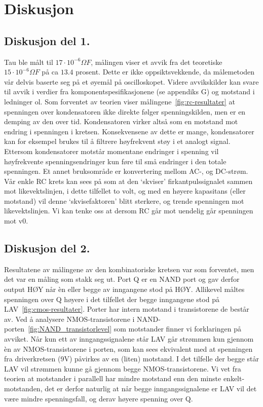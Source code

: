 \section{Diskusjon}

\subsection{Diskusjon del 1.}

    Tau ble målt til $17 \cdot 10^{-6} \Omega F$, målingen viser et avvik fra det teoretiske $15 \cdot 10^{-6} \Omega F$ på ca $13.4$ prosent.
    Dette er ikke oppsiktsvekkende, da målemetoden vår delvis baserte seg på et øyemål på oscilloskopet.
    Videre avvikskilder kan svare til avvik i verdier fra komponentspesifikasjonene (se appendiks G) og motstand i ledninger ol.
    Som forventet av teorien viser målingene~\ref{fig:rc-resultater} at spenningen over kondensatoren ikke direkte følger spenningskilden, men er en demping av den over tid.
    Kondensatoren virker altså som en motstand mot endring i spenningen i kretsen.
    Konsekvensene av dette er mange, kondensatorer kan for eksempel brukes til å filtrere høyfrekvent støy i et analogt signal.
    Ettersom kondensatorer motstår momentane endringer i spenning vil høyfrekvente spenningsendringer kun føre til små endringer i den totale spenningen.
    Et annet bruksområde er konvertering mellom AC-, og DC-strøm.
    Vår enkle RC krets kan sees på som at den ‘skviser’ firkantpulssignalet sammen mot likevektslinjen, i dette tilfellet to volt, og med en høyere kapasitans (eller motstand) vil denne ‘skvisefaktoren’ blitt sterkere, og trende spenningen mot likevektslinjen.
    Vi kan tenke oss at dersom RC går mot uendelig går spenningen mot v0.

\subsection{Diskusjon del 2.}

    Resultatene av målingene av den kombinatoriske kretsen var som forventet, men det var en måling som stakk seg ut.
    Port Q er en NAND port og gav derfor output HØY når èn eller begge av inngangene stod på HØY.
    Allikevel måltes spenningen over Q høyere i det tilfellet der begge inngangene stod på LAV~\ref{fig:cmos-resultater}.
    Porter har intern motstand i transistorene de består av.
    Ved å analysere NMOS-transistorene i NAND-porten~\ref{fig:NAND_transistorlevel} som motstander finner vi forklaringen på avviket.
    Når kun ett av inngangssignalene står LAV går strømmen kun gjennom èn av NMOS-transistorene i porten, som kan sees ekvivalent med at spenningen fra driverkretsen (9V) påvirkes av en (liten) motstand.
    I det tilfelle der begge står LAV vil strømmen kunne gå gjennom begge NMOS-transistorene.
    Vi vet fra teorien at motstander i parallell har mindre motstand enn den minste enkelt-motstanden, det er derfor naturlig at når begge inngangssignalene er LAV vil det være mindre spenningsfall, og derav høyere spenning over Q.

